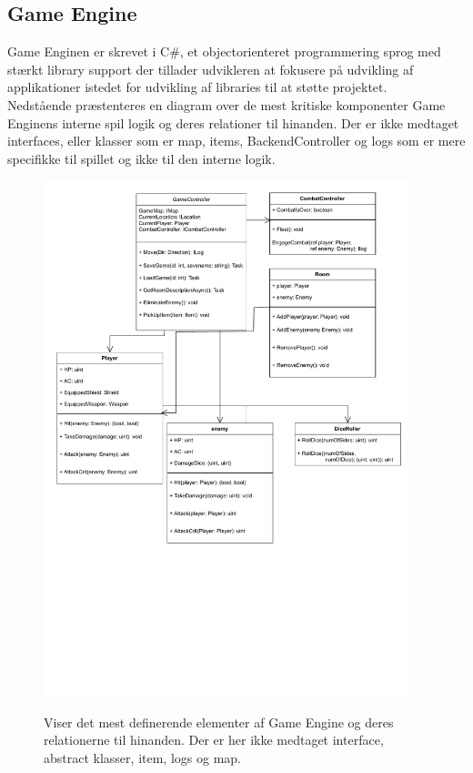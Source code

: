 \subsection{Game Engine}
Game Enginen er skrevet i C\#, et objectorienteret programmering sprog
med stærkt library support der tillader udvikleren at fokusere på udvikling
af applikationer istedet for udvikling af libraries til at støtte projektet. \\

\noindent Nedstående præstenteres en diagram over de mest kritiske komponenter
Game Enginens interne spil logik og deres relationer til hinanden.
Der er ikke medtaget interfaces, eller klasser som er map, items, BackendController 
og logs som er mere specifikke til spillet og ikke til den interne logik.\\

\begin{figure}[h]
  \centering
   \caption{Viser det mest definerende elementer af Game Engine og deres relationerne til hinanden. Der er her ikke medtaget interface,
           abstract klasser, item, logs og map. }%
  \includegraphics[width=0.9\linewidth, height=15cm, trim = 0 8cm 0 3cm]{02-Body/Implementering/GameEngineImplementering/Images/Core Class Diagram.pdf}
  \label{fig:CoreClassDiagram}
\end{figure}

